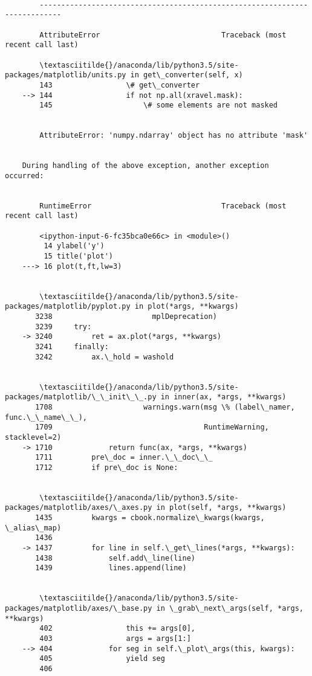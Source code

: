 \documentclass[11pt]{article}
\begin{document}
    \begin{Verbatim}[commandchars=\\\{\}]

        ---------------------------------------------------------------------------

        AttributeError                            Traceback (most recent call last)

        \textasciitilde{}/anaconda/lib/python3.5/site-packages/matplotlib/units.py in get\_converter(self, x)
        143                 \# get\_converter
    --> 144                 if not np.all(xravel.mask):
        145                     \# some elements are not masked


        AttributeError: 'numpy.ndarray' object has no attribute 'mask'

        
    During handling of the above exception, another exception occurred:


        RuntimeError                              Traceback (most recent call last)

        <ipython-input-6-fc35bca0e66c> in <module>()
         14 ylabel('y')
         15 title('plot')
    ---> 16 plot(t,ft,lw=3)
    

        \textasciitilde{}/anaconda/lib/python3.5/site-packages/matplotlib/pyplot.py in plot(*args, **kwargs)
       3238                       mplDeprecation)
       3239     try:
    -> 3240         ret = ax.plot(*args, **kwargs)
       3241     finally:
       3242         ax.\_hold = washold


        \textasciitilde{}/anaconda/lib/python3.5/site-packages/matplotlib/\_\_init\_\_.py in inner(ax, *args, **kwargs)
       1708                     warnings.warn(msg \% (label\_namer, func.\_\_name\_\_),
       1709                                   RuntimeWarning, stacklevel=2)
    -> 1710             return func(ax, *args, **kwargs)
       1711         pre\_doc = inner.\_\_doc\_\_
       1712         if pre\_doc is None:


        \textasciitilde{}/anaconda/lib/python3.5/site-packages/matplotlib/axes/\_axes.py in plot(self, *args, **kwargs)
       1435         kwargs = cbook.normalize\_kwargs(kwargs, \_alias\_map)
       1436 
    -> 1437         for line in self.\_get\_lines(*args, **kwargs):
       1438             self.add\_line(line)
       1439             lines.append(line)


        \textasciitilde{}/anaconda/lib/python3.5/site-packages/matplotlib/axes/\_base.py in \_grab\_next\_args(self, *args, **kwargs)
        402                 this += args[0],
        403                 args = args[1:]
    --> 404             for seg in self.\_plot\_args(this, kwargs):
        405                 yield seg
        406 



\end{Verbatim}
\end{document}
